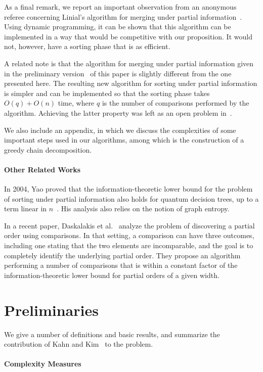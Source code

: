 \documentclass{article} \usepackage{fullpage}
\begin{document}
As a final remark, we report an important observation from an anonymous referee concerning Linial's algorithm for merging under partial information~\cite{L84}. Using dynamic programming, it can be shown that this algorithm can be implemented in a way that would be competitive with our proposition. It would not, however, have a sorting phase that is as efficient.

A related note is that the algorithm for merging under partial information given in the preliminary version~\cite{SUPI-STOC} of this paper is slightly different from the one presented here. The resulting new algorithm for sorting under partial information is simpler and can be implemented so that the sorting phase takes $O(q) + O(n)$ time, where $q$ is the number of comparisons performed by the algorithm. Achieving the latter property was left as an open problem in~\cite{SUPI-STOC}.

We also include an appendix, in which we discuss the complexities of some important steps used in our algorithms, among which is the construction of a greedy chain decomposition.

\paragraph*{Other Related Works}
In 2004, Yao proved that the information-theoretic lower bound for the problem of sorting under partial information also holds for quantum decision trees, up to a term linear in $n$~\cite{Yao04}. His analysis also relies on the notion of graph entropy.

In a recent paper, Daskalakis et al.~\cite{DKMRV09} analyze the problem of discovering a partial order using comparisons. In that setting, a comparison can have three outcomes, including one stating that the two elements are incomparable, and the goal is to completely identify the underlying partial order. They propose an algorithm performing a number of comparisons that is within a constant factor of the information-theoretic lower bound for partial orders of a given width.

\section{Preliminaries}
\label{sec:prelim}

We give a number of definitions and basic results, and summarize the contribution of Kahn and Kim~\cite{KK95} to the problem. 

\paragraph*{Complexity Measures}
\end{document}
